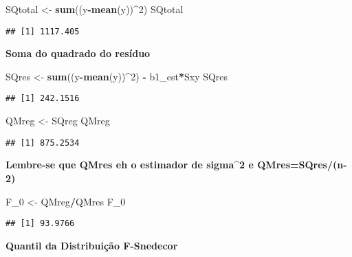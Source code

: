 \documentclass[
]{article}
\newenvironment{Shaded}{\begin{snugshade}}{\end{snugshade}}
\newcommand{\DecValTok}[1]{\textcolor[rgb]{0.00,0.00,0.81}{#1}}
\newcommand{\KeywordTok}[1]{\textcolor[rgb]{0.13,0.29,0.53}{\textbf{#1}}}
\newcommand{\NormalTok}[1]{#1}
\newcommand{\OperatorTok}[1]{\textcolor[rgb]{0.81,0.36,0.00}{\textbf{#1}}}
\newcommand{\StringTok}[1]{\textcolor[rgb]{0.31,0.60,0.02}{#1}}
\begin{document}
\begin{Shaded}
\begin{Highlighting}[]
\NormalTok{SQtotal <-}\StringTok{ }\KeywordTok{sum}\NormalTok{((y}\OperatorTok{-}\KeywordTok{mean}\NormalTok{(y))}\OperatorTok{^}\DecValTok{2}\NormalTok{)}
\NormalTok{SQtotal}
\end{Highlighting}
\end{Shaded}

\begin{verbatim}
## [1] 1117.405
\end{verbatim}

\textbf{Soma do quadrado do resíduo}

\begin{Shaded}
\begin{Highlighting}[]
\NormalTok{SQres <-}\StringTok{ }\KeywordTok{sum}\NormalTok{((y}\OperatorTok{-}\KeywordTok{mean}\NormalTok{(y))}\OperatorTok{^}\DecValTok{2}\NormalTok{) }\OperatorTok{-}\StringTok{ }\NormalTok{b1_est}\OperatorTok{*}\NormalTok{Sxy}
\NormalTok{SQres}
\end{Highlighting}
\end{Shaded}

\begin{verbatim}
## [1] 242.1516
\end{verbatim}

\begin{Shaded}
\begin{Highlighting}[]
\NormalTok{QMreg <-}\StringTok{ }\NormalTok{SQreg}
\NormalTok{QMreg}
\end{Highlighting}
\end{Shaded}

\begin{verbatim}
## [1] 875.2534
\end{verbatim}

\textbf{Lembre-se que QMres eh o estimador de sigma\^{}2 e
QMres=SQres/(n-2)}

\begin{Shaded}
\begin{Highlighting}[]
\NormalTok{F_}\DecValTok{0}\NormalTok{ <-}\StringTok{ }\NormalTok{QMreg}\OperatorTok{/}\NormalTok{QMres}
\NormalTok{F_}\DecValTok{0}
\end{Highlighting}
\end{Shaded}

\begin{verbatim}
## [1] 93.9766
\end{verbatim}

\textbf{Quantil da Distribuição F-Snedecor}
\end{document}
